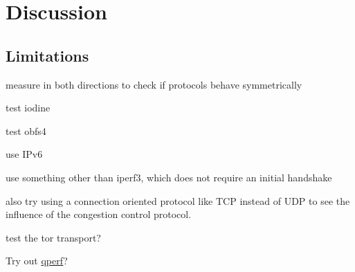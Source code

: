 
\chapter{Discussion}
\label{chap:discussion}
\section{Limitations}

measure in both directions to check if protocols behave symmetrically

test iodine

test obfs4

use IPv6

use something other than iperf3, which does not require an initial handshake

also try using a connection oriented protocol like TCP instead of UDP to see the influence of the congestion control protocol.

test the tor transport? 

Try out \href{https://github.com/rbruenig/qperf}{qperf}?
